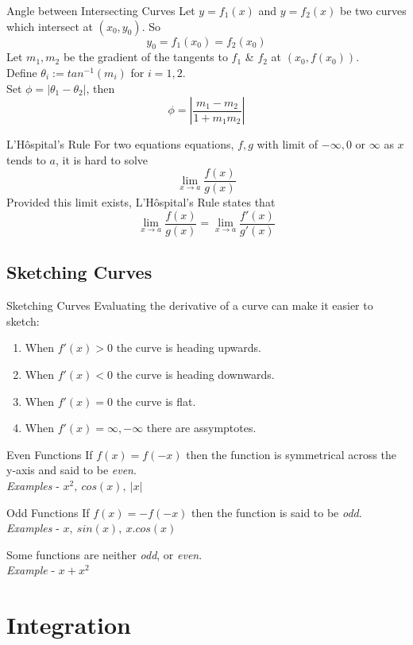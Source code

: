 \documentclass[11pt,a4paper]{article}
\begin{document}
\subtitle{Theorem 3.10 - }{Angle between Intersecting Curves}
Let $y = f_1(x)$ and $y = f_2(x)$ be two curves which intersect at $(x_0, y_0)$. So
$$y_0 = f_1(x_0) = f_2(x_0)$$
Let $m_1, m_2$ be the gradient of the tangents to $f_1$ \& $f_2$ at $(x_0, f(x_0))$. \\
Define $\theta_i := tan^{-1}(m_i)$ for $i = 1, 2$. \\
Set $\phi = |\theta_1 - \theta_2|$, then
$$\phi = \left|\frac{m_1 - m_2}{1 + m_1m_2}\right|$$

\subtitle{Theorem 3.11 - }{L'H\^{o}spital's Rule}
For two equations equations, $f,g$ with limit of $-\infty, 0$ or $\infty$ as $x$ tends to $a$, it is hard to solve
$$\lim_{x \to a}\frac{f(x)}{g(x)}$$
Provided this limit exists, L'H\^{o}spital's Rule states that
$$\lim_{x \to a}\frac{f(x)}{g(x)} = \lim_{x \to a}\frac{f'(x)}{g'(x)}$$

\subsection{Sketching Curves}

\subtitle{Remark 3.11 - }{Sketching Curves}
Evaluating the derivative of a curve can make it easier to sketch:
\begin{enumerate}[label=\roman*)]
  \item When $f'(x) > 0$ the curve is heading upwards.
  \item When $f'(x) < 0$ the curve is heading downwards.
  \item When $f'(x) = 0$ the curve is flat.
  \item When $f'(x) = \infty, -\infty$ there are assymptotes.
\end{enumerate}

\subtitle{Definition 3.12 - }{Even Functions}
If $f(x) = f(-x)$ then the function is symmetrical across the y-axis and said to be \textit{even}. \\
\textit{Examples} - $x^2,\ cos(x),\ |x|$ \\

\subtitle{Definition 3.13 - }{Odd Functions}
If $f(x) = -f(-x)$ then the function is said to be \textit{odd}. \\
\textit{Examples} - $x,\ sin(x),\ x.cos(x)$\\

\subtitle{Remark 3.14}{}
Some functions are neither \textit{odd}, or \textit{even}. \\
\textit{Example} - $x + x^2$

\section{Integration}
\end{document}
